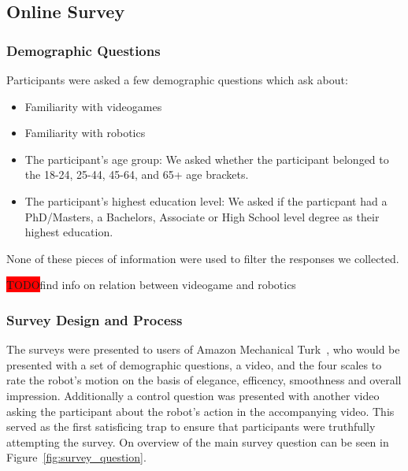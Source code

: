 \documentclass[letterpaper, 10 pt, conference]{ieeeconf}  %
\newcommand{\todo}{\colorbox{red}{TODO}}
\begin{document}
\subsection{Online Survey}



\subsubsection{Demographic Questions}

Participants were asked a few demographic questions which ask about:

\begin{itemize}
\item Familiarity with videogames
\item Familiarity with robotics
\item The participant's age group: We asked whether the participant belonged to the 18-24, 25-44, 45-64, and 65+ age brackets.
\item The participant's highest education level: We asked if the particpant had a PhD/Masters, a Bachelors, Associate or High School level degree as their highest education.
\end{itemize}

None of these pieces of information were used to filter the responses we collected.

\todo find info on relation between videogame and robotics

\subsubsection{Survey Design and Process}

The surveys were presented to users of Amazon Mechanical Turk~\cite{paolacci2010running}, who would be presented with a set of demographic questions, a video, and the four scales to rate the robot's motion on the basis of elegance, efficency, smoothness and overall impression. Additionally a control question was presented with another video asking the participant about the robot's action in the accompanying video. This served as the first satisficing trap to ensure that participants were truthfully attempting the survey. On overview of the main survey question can be seen in Figure~\ref{fig:survey_question}.
\end{document}
